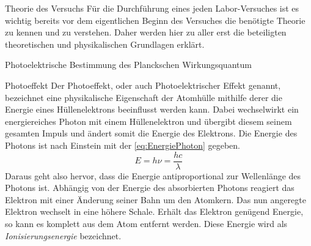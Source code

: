 \documentclass[pdftex, a4paper,11pt, twoside, ngerman]{report}
\begin{document}
  \begin{chapter}{Theorie des Versuchs}
    \label{chp:Theorie}
    Für die Durchführung eines jeden Labor-Versuches ist es wichtig bereits vor dem eigentlichen Beginn des Versuches die benötigte Theorie zu kennen und zu verstehen. Daher werden hier zu aller erst die beteiligten theoretischen und physikalischen Grundlagen erklärt.
    
    
    
    \begin{section}{Photoelektrische Bestimmung des Planckschen Wirkungsquantum}
      \label{chp:TheoriePhotoelektrischesWirkungsquantum}
      
      
      
      \begin{subsection}{Photoeffekt}
        \label{chp:TheoriePhotoelektrischesWirkungsquantumPhotoeffekt}
        Der Photoeffekt, oder auch Photoelektrischer Effekt genannt, bezeichnet eine physikalische Eigenschaft der Atomhülle mithilfe derer die Energie eines Hüllenelektrons beeinflusst werden kann. Dabei wechselwirkt ein energiereiches Photon mit einem Hüllenelektron und übergibt diesem seinem gesamten Impuls und ändert somit die Energie des Elektrons. Die Energie des Photons ist nach Einstein mit der \cref{eq:EnergiePhoton} gegeben.
        \begin{equation}
          \label{eq:EnergiePhoton}
          E=h\nu=\frac{hc}{\lambda}
        \end{equation}
        Daraus geht also hervor, dass die Energie antiproportional zur Wellenlänge des Photons ist. Abhängig von der Energie des absorbierten Photons reagiert das Elektron mit einer Änderung seiner Bahn um den Atomkern. Das nun angeregte Elektron wechselt in eine höhere Schale. Erhält das Elektron genügend Energie, so kann es komplett aus dem Atom entfernt werden. Diese Energie wird als \textit{Ionisierungsenergie} bezeichnet.
        

\end{subsection}
\end{section}
\end{chapter}
\end{document}
